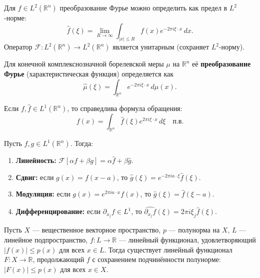 \documentclass[../NDCNNAI_main.tex]{subfiles}
\begin{document}
\begin{definition}
Для $f \in L^2(\mathbb{R}^n)$ преобразование Фурье можно определить как предел в $L^2$-норме:
\[
\hat{f}(\xi) = \lim_{R \to \infty} \int_{|x| \le R} f(x) e^{-2\pi i \xi \cdot x} \, dx.
\]
Оператор $\mathcal{F}\colon L^2(\mathbb{R}^n) \to L^2(\mathbb{R}^n)$ является унитарным (сохраняет $L^2$-норму).
\end{definition}

\begin{definition}
Для конечной комплекснозначной борелевской меры $\mu$ на $\mathbb{R}^n$ её \textbf{преобразование Фурье} (характеристическая функция) определяется как
\[
\hat{\mu}(\xi) = \int_{\mathbb{R}^n} e^{-2\pi i \xi \cdot x} \, d\mu(x).
\]
\end{definition}

\begin{theorem}
Если $f, \hat{f} \in L^1(\mathbb{R}^n)$, то справедлива формула обращения:
\[
f(x) = \int_{\mathbb{R}^n} \hat{f}(\xi) e^{2\pi i \xi \cdot x} \, d\xi \quad \text{п.в.}
\]
\end{theorem}

\begin{theorem}
Пусть $f, g \in L^1(\mathbb{R}^n)$. Тогда:
\begin{enumerate}
    \item \textbf{Линейность:} $\mathcal{F}[\alpha f + \beta g] = \alpha \hat{f} + \beta \hat{g}$.
    \item \textbf{Сдвиг:} если $g(x) = f(x - a)$, то $\hat{g}(\xi) = e^{-2\pi i a \cdot \xi} \hat{f}(\xi)$.
    \item \textbf{Модуляция:} если $g(x) = e^{2\pi i a \cdot x} f(x)$, то $\hat{g}(\xi) = \hat{f}(\xi - a)$.
    \item \textbf{Дифференцирование:} если $\partial_{x_j} f \in L^1$, то $\widehat{\partial_{x_j} f}(\xi) = 2\pi i \xi_j \hat{f}(\xi)$.
\end{enumerate}
\end{theorem}
\begin{theorem}
Пусть \( X \) --- вещественное векторное пространство, \( p \) --- полунорма на \( X \), \( L \) --- линейное подпространство, \( f\colon L \to \mathbb{R} \) --- линейный функционал, удовлетворяющий \( |f(x)| \le p(x) \) для всех \( x \in L \). Тогда существует линейный функционал \( F\colon X \to \mathbb{R} \), продолжающий \( f \) с сохранением подчинённости полунорме: \( |F(x)| \le p(x) \) для всех \( x \in X \).
\end{theorem}
\end{document}
